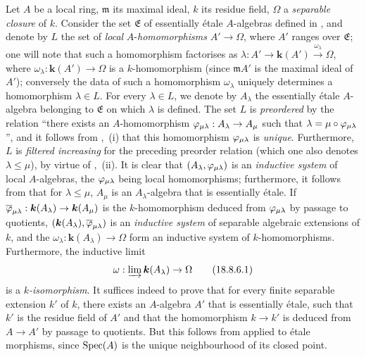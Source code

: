 \begin{env}[18.8.6]
\label{IV.18.8.6}
Let $A$ be a local ring, $\mathfrak{m}$ its maximal ideal, $k$ its residue field, $\Omega$ a \emph{separable closure} of $k$.
Consider the set $\mathfrak{E}$ of essentially \'{e}tale $A$-algebras defined in , and denote by $L$ the set of \emph{local} $A$-\emph{homomorphisms} $A'\to\Omega$, where $A'$ ranges over $\mathfrak{E}$;
one will note that such a homomorphism factorises as $\lambda:A'\to\boldsymbol{k}(A')\xrightarrow{\omega_\lambda}\Omega$, where $\omega_\lambda:\boldsymbol{k}(A')\to\Omega$ is a $k$-homomorphism (since $\mathfrak{m}A'$ is the maximal ideal of $A'$);
conversely the data of such a homomorphism $\omega_\lambda$ uniquely determines a homomorphism $\lambda\in L$.
For every $\lambda\in L$, we denote by $A_\lambda$ the essentially \'{e}tale $A$-algebra belonging to $\mathfrak{E}$ on which $\lambda$ is defined.
The set $L$ is \emph{preordered} by the relation ``there exists an $A$-homomorphism $\varphi_{\mu\lambda}:A_\lambda\to A_\mu$ such that $\lambda=\mu\circ\varphi_{\mu\lambda}$'', and it follows from ,~(i) that this homomorphism $\varphi_{\mu\lambda}$ is \emph{unique}.
Furthermore, $L$ is \emph{filtered increasing} for the preceding preorder relation (which one also denotes $\lambda\leq\mu$), by virtue
of ,~(ii).
It is clear that $(A_\lambda,\varphi_{\mu\lambda})$ is an \emph{inductive system} of local $A$-algebras, the $\varphi_{\mu\lambda}$ being local homomorphisms;
furthermore, it follows from  that for $\lambda\leq\mu$, $A_\mu$ is an $A_\lambda$-algebra that is essentially \'{e}tale.
If $\overline{\varphi}_{\mu\lambda}:\boldsymbol{k}(A_\lambda)\to\boldsymbol{k}(A_\mu)$ is the $k$-homomorphism deduced from $\varphi_{\mu\lambda}$ by passage to quotients, $(\boldsymbol{k}(A_\lambda),\overline{\varphi}_{\mu\lambda})$ is an \emph{inductive system} of separable algebraic extensions of $k$, and the $\omega_\lambda:\boldsymbol{k}(A_\lambda)\to\Omega$ form an inductive system of $k$-homomorphisms.
Furthermore, the inductive limit
\begin{equation}
  \omega:\varinjlim\boldsymbol{k}(A_\lambda)\to\Omega
  \label{IV.18.8.6.1}
\tag{18.8.6.1}
\end{equation}
is a $k$\emph{-isomorphism}.
It suffices indeed to prove that for every finite separable extension $k'$ of $k$, there exists an $A$-algebra $A'$ that is essentially \'{e}tale, such that $k'$ is the residue field of $A'$ and that the homomorphism $k\to k'$ is deduced from $A\to A'$ by passage to quotients.
But this follows from  applied to \'{e}tale morphisms, since $\operatorname{Spec}(A)$ is the unique neighbourhood of its closed point.


\end{env}
